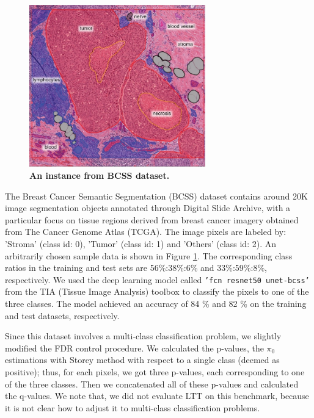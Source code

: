 \documentclass{article}
\begin{document}
\begin{figure}[h!]
	\centering
	\includegraphics[width=3in]{img/bcss_instance.jpeg}
	\caption{{\bf An instance from BCSS dataset.}}
	\label{fig:bcss_example}
\end{figure} 

The Breast Cancer Semantic Segmentation (BCSS) dataset \cite{Amgad2019StructuredCE} contains around 20K image segmentation objects annotated through Digital Slide Archive, with a particular focus on tissue regions derived from breast cancer imagery obtained from The Cancer Genome Atlas (TCGA). The image pixels are labeled by: 'Stroma' (class id: 0), 'Tumor' (class id: 1) and 'Others' (class id: 2).  An arbitrarily chosen sample data is shown in Figure \ref{fig:bcss_example}. The corresponding class ratios in the training and test sets are 56\%:38\%:6\% and 33\%:59\%:8\%, respectively. We used the deep learning model called \texttt{'fcn resnet50 unet-bcss'} from the TIA (Tissue Image Analysis) toolbox \cite{Pocock2022} to classify the pixels to one of the three classes. The model achieved an accuracy of 84 \% and 82 \% on the training and test datasets, respectively. 

Since this dataset involves a multi-class classification problem, we slightly modified the FDR control procedure. We calculated the p-values, the $\pi_0$ estimations with Storey method with respect to a single class (deemed as positive); thus, for each pixels, we got three p-values, each corresponding to one of the three classes. Then we concatenated all of these p-values and calculated the q-values. We note that, we did not evaluate LTT on this benchmark, because it is not clear how to adjust it to multi-class classification problems.



\end{document}

